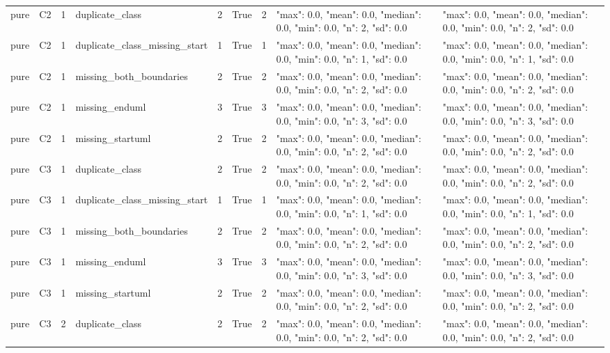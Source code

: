 \begin{tabular}{lllllllll}
pure & C2 & 1 & duplicate\_class & 2 & True & 2 & {"max": 0.0, "mean": 0.0, "median": 0.0, "min": 0.0, "n": 2, "sd": 0.0} & {"max": 0.0, "mean": 0.0, "median": 0.0, "min": 0.0, "n": 2, "sd": 0.0} \\
pure & C2 & 1 & duplicate\_class\_missing\_start & 1 & True & 1 & {"max": 0.0, "mean": 0.0, "median": 0.0, "min": 0.0, "n": 1, "sd": 0.0} & {"max": 0.0, "mean": 0.0, "median": 0.0, "min": 0.0, "n": 1, "sd": 0.0} \\
pure & C2 & 1 & missing\_both\_boundaries & 2 & True & 2 & {"max": 0.0, "mean": 0.0, "median": 0.0, "min": 0.0, "n": 2, "sd": 0.0} & {"max": 0.0, "mean": 0.0, "median": 0.0, "min": 0.0, "n": 2, "sd": 0.0} \\
pure & C2 & 1 & missing\_enduml & 3 & True & 3 & {"max": 0.0, "mean": 0.0, "median": 0.0, "min": 0.0, "n": 3, "sd": 0.0} & {"max": 0.0, "mean": 0.0, "median": 0.0, "min": 0.0, "n": 3, "sd": 0.0} \\
pure & C2 & 1 & missing\_startuml & 2 & True & 2 & {"max": 0.0, "mean": 0.0, "median": 0.0, "min": 0.0, "n": 2, "sd": 0.0} & {"max": 0.0, "mean": 0.0, "median": 0.0, "min": 0.0, "n": 2, "sd": 0.0} \\
pure & C3 & 1 & duplicate\_class & 2 & True & 2 & {"max": 0.0, "mean": 0.0, "median": 0.0, "min": 0.0, "n": 2, "sd": 0.0} & {"max": 0.0, "mean": 0.0, "median": 0.0, "min": 0.0, "n": 2, "sd": 0.0} \\
pure & C3 & 1 & duplicate\_class\_missing\_start & 1 & True & 1 & {"max": 0.0, "mean": 0.0, "median": 0.0, "min": 0.0, "n": 1, "sd": 0.0} & {"max": 0.0, "mean": 0.0, "median": 0.0, "min": 0.0, "n": 1, "sd": 0.0} \\
pure & C3 & 1 & missing\_both\_boundaries & 2 & True & 2 & {"max": 0.0, "mean": 0.0, "median": 0.0, "min": 0.0, "n": 2, "sd": 0.0} & {"max": 0.0, "mean": 0.0, "median": 0.0, "min": 0.0, "n": 2, "sd": 0.0} \\
pure & C3 & 1 & missing\_enduml & 3 & True & 3 & {"max": 0.0, "mean": 0.0, "median": 0.0, "min": 0.0, "n": 3, "sd": 0.0} & {"max": 0.0, "mean": 0.0, "median": 0.0, "min": 0.0, "n": 3, "sd": 0.0} \\
pure & C3 & 1 & missing\_startuml & 2 & True & 2 & {"max": 0.0, "mean": 0.0, "median": 0.0, "min": 0.0, "n": 2, "sd": 0.0} & {"max": 0.0, "mean": 0.0, "median": 0.0, "min": 0.0, "n": 2, "sd": 0.0} \\
pure & C3 & 2 & duplicate\_class & 2 & True & 2 & {"max": 0.0, "mean": 0.0, "median": 0.0, "min": 0.0, "n": 2, "sd": 0.0} & {"max": 0.0, "mean": 0.0, "median": 0.0, "min": 0.0, "n": 2, "sd": 0.0} \\

\end{tabular}
